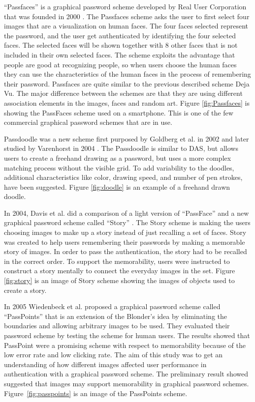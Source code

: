   ``Passfaces'' is a graphical password scheme developed by Real User Corporation that was founded in 2000 \cite{passface}. The Passfaces scheme asks the user to first select four images that are a visualization on human faces. The four faces selected represent the password, and the user get authenticated by identifying the four selected faces. The selected faces will be shown together with 8 other faces that is not included in their own selected faces. The scheme exploits the advantage that people are good at recognizing people, so when users choose the human faces they can use the characteristics of the human faces in the process of remembering their password. Passfaces are quite similar to the previous described scheme Deja Vu. The major difference between the schemes are that they are using different association elements in the images, faces and random art. Figure \ref{fig:Passfaces} is showing the PassFaces scheme used on a smartphone. This is one of the few commercial graphical password schemes that are in use. 

  Passdoodle was a new scheme first purposed by Goldberg et al. in 2002 and later studied by Varenhorst in 2004 \cite{PassDoodle,Varenhorst}. The Passdoodle is similar to DAS, but allows users to create a freehand drawing as a password, but uses a more complex matching process without the visible grid. To add variability to the doodles, additional characteristics like color, drawing speed, and number of pen strokes, have been suggested. Figure \ref{fig:doodle} is an example of a freehand drawn doodle.

  In 2004, Davis et al. did a comparison of a light version of ``PassFace'' and a new graphical password scheme called ``Story'' \cite{Davis}. The Story scheme is making the users choosing images to make up a story instead of just recalling a set of faces. Story was created to help users remembering their passwords by making a memorable story of images. In order to pass the authentication, the story had to be recalled in the correct order. To support the memorability, users were instructed to construct a story mentally to connect the everyday images in the set. Figure \ref{fig:story} is an image of Story scheme showing the images of objects used to create a story.

  
  In 2005 Wiedenbeck et al. proposed a graphical password scheme called ``PassPoints'' \cite{Wiedenbeck2} that is an  extension of the Blonder's \cite{Blonder} idea by eliminating the boundaries and allowing arbitrary images to be used. They evaluated their password scheme by testing the scheme for human users. The results showed that PassPoint were a promising scheme with respect to memorability because of the low error rate and low clicking rate. The aim of this study was to get an understanding of how different images affected user performance in authentication with a graphical password scheme. The preliminary result showed suggested that images may support memorability in graphical password schemes. Figure~\ref{fig:passpoints} is an image of the PassPoints scheme.

